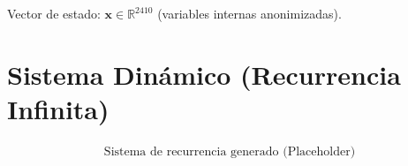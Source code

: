 \documentclass[10pt, a4paper]{article}
\begin{document}
Vector de estado: $\mathbf{x} \in \mathbb{R}^{2410}$ (variables internas anonimizadas).\\\part{Sistema Dinámico (Recurrencia Infinita)}
\begin{align*}
\text{Sistema de recurrencia generado (Placeholder)} \\
\end{align*}
\end{document}
